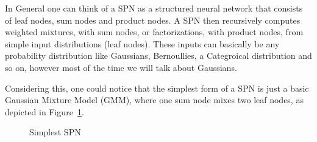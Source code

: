 In General one can think of a SPN as a structured neural network that consists of leaf nodes, sum nodes and product 
nodes. A SPN then recursively computes weighted mixtures, with sum nodes, or factorizations, with product nodes, from simple input distributions (leaf nodes). 
These inputs can basically be any probability distribution like Gaussians, Bernoullies, a Categroical distribution and so on,
however most of the time we will talk about Gaussians.

Considering this, one could notice that the simplest form of a SPN is just a basic 
Gaussian Mixture Model (GMM), where one sum node mixes two leaf nodes, as depicted in Figure~\ref{fig:spn_gmm}.

\begin{figure}[h!]
    \centering
    \caption{Simplest SPN}
    \label{fig:spn_gmm}
\end{figure}

